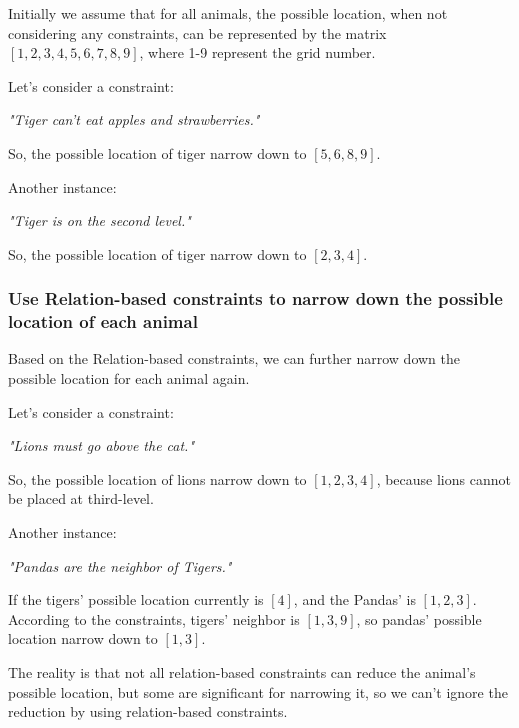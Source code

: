 \documentclass{mcmthesis}
\begin{document}
				Initially we assume that for all animals, the possible location, when not considering any constraints, can be represented by the matrix $ [1, 2, 3, 4, 5, 6, 7, 8, 9] $, where 1-9 represent the grid number.
				
				Let's consider a constraint:
				
				\begin{center}
					\emph{"Tiger can't eat apples and strawberries."}
				\end{center}
			
				So, the possible location of tiger narrow down to $ [5, 6, 8, 9] $.
				
				Another instance:
				
				\begin{center}
					\emph{"Tiger is on the second level."}
				\end{center}
				
				So, the possible location of tiger narrow down to $ [2, 3, 4] $.
			
			\subsubsection{Use Relation-based constraints to narrow down the possible location of each animal}
			
				Based on the Relation-based constraints, we can further narrow down the possible location for each animal again.
				
				Let's consider a constraint:
				
				\begin{center}
					\emph{"Lions must go above the cat."}
				\end{center}
				
				So, the possible location of lions narrow down to $ [1, 2, 3, 4] $, because lions cannot be placed at third-level.
				
				Another instance:
				
				\begin{center}
					\emph{"Pandas are the neighbor of Tigers."}
				\end{center}
				
				If the tigers' possible location currently is $ [4] $, and the Pandas' is $ [1, 2, 3] $. According to the constraints, tigers' neighbor is $[1, 3, 9]$, so pandas' possible location narrow down to $[1, 3]$.
				
				The reality is that not all relation-based constraints can reduce the animal's possible location, but some are significant for narrowing it, so we can't ignore the reduction by using relation-based constraints.
			
\end{document}
